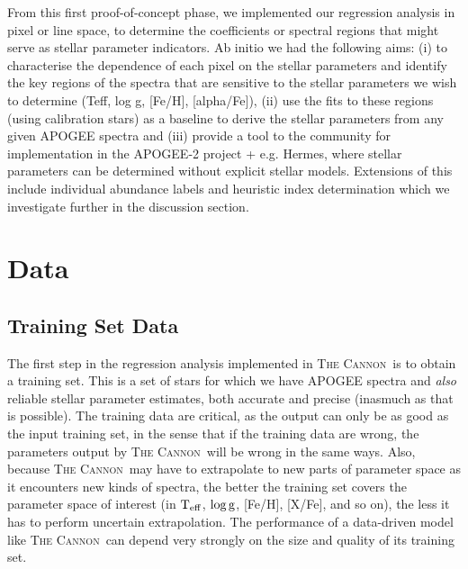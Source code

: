 \documentclass[12pt, preprint]{aastex}
\newcommand{\teff}{\mbox{$\rm T_{eff}$}}
\newcommand{\logg}{\mbox{$\rm \log g$}}
\newcommand{\tc}{\textsc{The Cannon}}
\begin{document}
From this first proof-of-concept phase, we implemented our regression analysis in pixel or line space, to determine the coefficients or spectral regions that might serve as stellar parameter indicators.  Ab initio we had the following aims: (i) to characterise the dependence of each pixel on the stellar parameters and identify the key regions of the spectra that are sensitive to the stellar parameters we wish to determine (Teff, log g, [Fe/H], [alpha/Fe]), (ii) use the fits to these regions (using calibration stars) as a baseline to derive the stellar parameters from any given APOGEE spectra and (iii) provide a tool to the community for implementation in the APOGEE-2 project + e.g. Hermes, where stellar parameters can be determined without explicit stellar models. Extensions of this include individual abundance labels and heuristic index determination which we investigate further in the discussion section.

\break 

\section{Data}

\subsection{Training Set Data}

The first step in the regression analysis implemented in \tc\ is to
obtain a training set.
This is a set of stars for which we have APOGEE spectra and
\emph{also} reliable stellar parameter estimates, both accurate and
precise (inasmuch as that is possible).
The training data are critical, as the output can only be as good as
the input training set, in the sense that if the training data are
wrong, the parameters output by \tc\ will be wrong in the same ways.
Also, because \tc\ may have to extrapolate to new parts of parameter
space as it encounters new kinds of spectra, the better the training
set covers the parameter space of interest (in \teff, \logg, [Fe/H],
[X/Fe], and so on), the less it has to perform uncertain
extrapolation.
The performance of a data-driven model like \tc\ can depend very
strongly on the size and quality of its training set.
\end{document}
